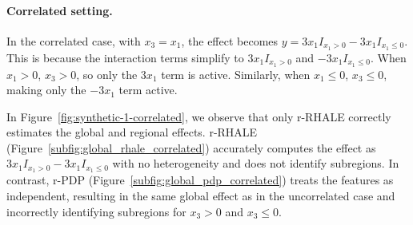 \documentclass[
twocolumn,
]{ceurart}
\begin{document}
\paragraph{Correlated setting.}

In the correlated case, with \( x_3 = x_1 \), the effect becomes \( y = 3x_1I_{x_1 > 0} - 3x_1I_{x_1 \leq 0} \). This is because the interaction terms simplify to \( 3x_1I_{x_1 > 0} \) and \( -3x_1I_{x_1 \leq 0} \). When \( x_1 > 0 \), \( x_3 > 0 \), so only the \( 3x_1 \) term is active. Similarly, when \( x_1 \leq 0 \), \( x_3 \leq 0 \), making only the \( -3x_1 \) term active.

In Figure~\ref{fig:synthetic-1-correlated}, we observe that only r-RHALE correctly estimates the global and regional effects. r-RHALE (Figure~\ref{subfig:global_rhale_correlated}) accurately computes the effect as \( 3x_1I_{x_1 > 0} - 3x_1I_{x_1 \leq 0} \) with no heterogeneity and does not identify subregions. In contrast, r-PDP (Figure~\ref{subfig:global_pdp_correlated}) treats the features as independent, resulting in the same global effect as in the uncorrelated case and incorrectly identifying subregions for \( x_3 > 0 \) and \( x_3 \leq 0 \).
\end{document}
